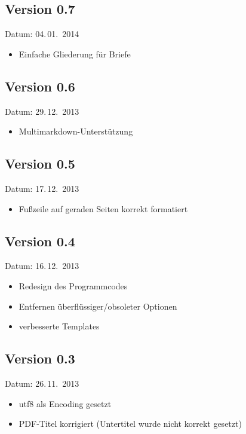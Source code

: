 \subsection{Version 0.7}

Datum: 04.\,01.~2014

\begin{itemize}
	\item Einfache Gliederung für Briefe
\end{itemize}

\subsection{Version 0.6}

Datum: 29.\,12.~2013

\begin{itemize}
	\item Multimarkdown-Unterstützung
\end{itemize}

\subsection{Version 0.5}

Datum: 17.\,12.~2013

\begin{itemize}
	\item Fußzeile auf geraden Seiten korrekt formatiert
\end{itemize}

\subsection{Version 0.4}

Datum: 16.\,12.~2013

\begin{itemize}
	\item Redesign des Programmcodes
	\item Entfernen überflüssiger/obsoleter Optionen
	\item verbesserte Templates
\end{itemize}

\subsection{Version 0.3}

Datum: 26.\,11.~2013

\begin{itemize}
	\item utf8 als Encoding gesetzt
	\item PDF-Titel korrigiert (Untertitel wurde nicht korrekt gesetzt)
\end{itemize}

